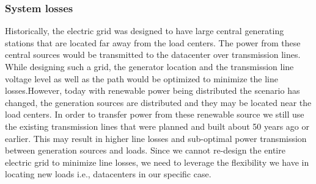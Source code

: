 \subsubsection{System losses}
Historically, the electric grid was designed to have large central generating stations that are located far away from the load centers. The power from these central sources would be transmitted to the datacenter over transmission lines. While designing such a grid, the generator location and the transmission line voltage level as well as the path would be optimized to minimize the line losses.However, today with renewable power being distributed the scenario has changed, the generation sources are distributed and they may be located near the load centers. In order to transfer power from these renewable source we still use the existing transmission lines that were planned and built about 50 years ago or earlier. This may result in higher line losses and sub-optimal power transmission between generation sources and loads. Since we cannot re-design the entire electric grid to minimize line losses, we need to leverage the flexibility we have in locating new loads i.e., datacenters in our specific case.

